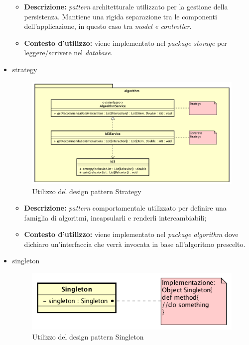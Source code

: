 \begin{itemize}
	\begin{itemize}
		\item \textbf{Descrizione:} \textit{pattern} architetturale utilizzato per la gestione della persistenza. Mantiene una rigida separazione tra le componenti dell'applicazione, in questo caso tra \textit{model e controller}.
		\item \textbf{Contesto d'utilizzo:} viene implementato nel \textit{package storage} per leggere/scrivere nel \textit{database}.
	\end{itemize}
	\item \gls{strategy}
	\begin{figure}[h]
\centering
\includegraphics[width=0.9\linewidth]{immagini/strategyPattern}
\caption[Utilizzo del design pattern Strategy]{Utilizzo del design pattern Strategy}
\label{fig:strategyPattern}
\end{figure}

	\begin{itemize}
		\item \textbf{Descrizione:} \textit{pattern} comportamentale utilizzato per definire una famiglia di algoritmi, incapsularli e renderli intercambiabili;
		\item \textbf{Contesto d'utilizzo:} viene implementato nel \textit{package algorithm} dove dichiaro un'interfaccia che verrà invocata in base all'algoritmo prescelto.
	\end{itemize}
	\item \gls{singleton}
	\begin{figure}[h]
\centering
\includegraphics[width=0.9\linewidth]{immagini/singletonpattern}
\caption[Utilizzo del design pattern Singleton]{Utilizzo del design pattern Singleton}
\label{fig:singletonpattern}
\end{figure}


\end{itemize}
